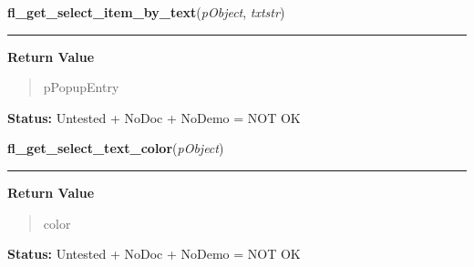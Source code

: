     \vspace{0.5ex}

\hspace{.8\funcindent}\begin{boxedminipage}{\funcwidth}

    \raggedright \textbf{fl\_get\_select\_item\_by\_text}(\textit{pObject}, \textit{txtstr})

    \vspace{-1.5ex}

    \rule{\textwidth}{0.5\fboxrule}
\setlength{\parskip}{2ex}
\setlength{\parskip}{1ex}
      \textbf{Return Value}
    \vspace{-1ex}

      \begin{quote}
      pPopupEntry

      \end{quote}

\textbf{Status:} Untested + NoDoc + NoDemo = NOT OK



    \end{boxedminipage}

    \label{xformslib:library:fl_get_select_text_color}

    \vspace{0.5ex}

\hspace{.8\funcindent}\begin{boxedminipage}{\funcwidth}

    \raggedright \textbf{fl\_get\_select\_text\_color}(\textit{pObject})

    \vspace{-1.5ex}

    \rule{\textwidth}{0.5\fboxrule}
\setlength{\parskip}{2ex}
\setlength{\parskip}{1ex}
      \textbf{Return Value}
    \vspace{-1ex}

      \begin{quote}
      color

      \end{quote}

\textbf{Status:} Untested + NoDoc + NoDemo = NOT OK



    \end{boxedminipage}

    \label{xformslib:library:fl_set_select_text_color}

